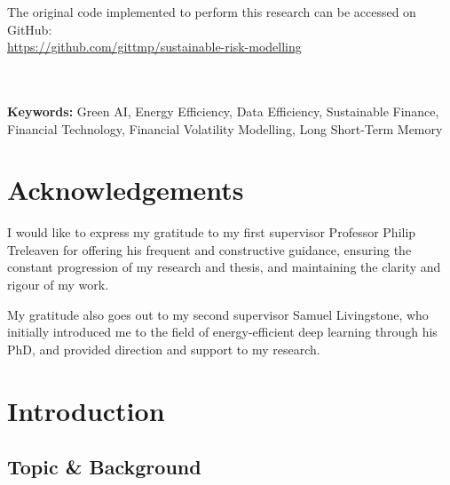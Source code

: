 \documentclass[a4paper, 11pt]{report}
\begin{document}
    \noindent The original code implemented to perform this research can be accessed on GitHub:\\ {\url{https://github.com/gittmp/sustainable-risk-modelling}}
    
    \textbf{\\ \\Keywords:} Green AI, Energy Efficiency, Data Efficiency, Sustainable Finance, Financial Technology, Financial Volatility Modelling, Long Short-Term Memory


    \newpage
    \chapter*{Acknowledgements}

    I would like to express my gratitude to my first supervisor Professor Philip Treleaven for offering his frequent and constructive guidance, ensuring the constant progression of my research and thesis, and maintaining the clarity and rigour of my work.

    My gratitude also goes out to my second supervisor Samuel Livingstone, who initially introduced me to the field of energy-efficient deep learning through his PhD, and provided direction and support to my research.


    \newpage
    \tableofcontents


    \newpage 
    \listoffigures


    \newpage
    \listoftables 




    \newpage
    \chapter{Introduction}
    \label{chapter: intro}

    \section{Topic \& Background}
    \label{section: topic}
\end{document}
